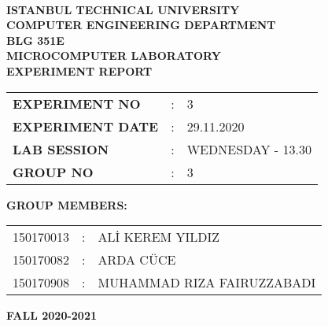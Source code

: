 \documentclass[pdftex,12pt,a4paper]{article}
\begin{document}
\begin{titlepage}
\begin{center}
\textbf{}\\
\textbf{\Large{ISTANBUL TECHNICAL UNIVERSITY}}\\
\vspace{0.5cm}
\textbf{\Large{COMPUTER ENGINEERING DEPARTMENT}}\\
\vspace{2cm}
\textbf{\Large{BLG 351E\\ MICROCOMPUTER LABORATORY\\ EXPERIMENT REPORT}}\\
\vspace{2.8cm}
\begin{table}[ht]
\centering
\Large{
\begin{tabular}{lcl}
\textbf{EXPERIMENT NO}  & : & 3 \\
\textbf{EXPERIMENT DATE}  & : & 29.11.2020 \\
\textbf{LAB SESSION}  & : & WEDNESDAY - 13.30 \\
\textbf{GROUP NO}  & : & 3 \\
\end{tabular}}
\end{table}
\vspace{1cm}
\textbf{\Large{GROUP MEMBERS:}}\\
\begin{table}[ht]
\centering
\Large{
\begin{tabular}{rcl}
150170013  & : & ALİ KEREM YILDIZ \\
150170082  & : & ARDA CÜCE \\
150170908  & : & MUHAMMAD RIZA FAIRUZZABADI \\
\end{tabular}}
\end{table}
\vspace{2.8cm}
\textbf{\Large{FALL 2020-2021}}

\end{center}

\end{titlepage}

\thispagestyle{empty}
\setcounter{tocdepth}{4}
\tableofcontents
\clearpage

\setcounter{page}{1}
\end{document}
